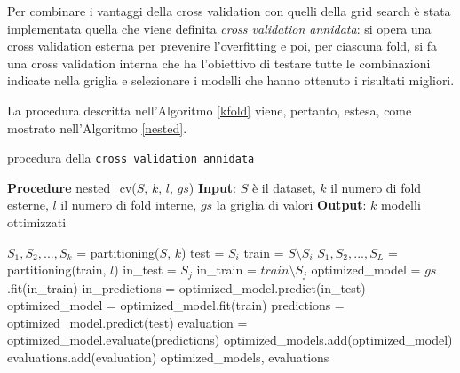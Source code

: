 \documentclass[12pt]{report}
\theoremstyle{definition}
\begin{document}
Per combinare i vantaggi della cross validation con quelli della grid search è stata implementata quella che viene definita \textit{cross validation annidata}: si opera una cross validation esterna per prevenire l'overfitting e poi, per ciascuna fold, si fa una cross validation interna che ha l'obiettivo di testare tutte le combinazioni indicate nella griglia e selezionare i modelli che hanno ottenuto i risultati migliori.

La procedura descritta nell'Algoritmo \ref{kfold} viene, pertanto, estesa, come mostrato nell'Algoritmo \ref{nested}.
\begin{algorithm}
\caption{procedura della \texttt{cross validation annidata}}
\label{nested}
\hspace*{\algorithmicindent} \textbf{Procedure} nested\_cv($S$, $k$, $l$, $gs$)
\newline
\hspace*{\algorithmicindent} \textbf{Input}: $S$ è il dataset, $k$ il numero di fold esterne, $l$ il numero di fold interne, $gs$ la griglia di valori
\newline
\hspace*{\algorithmicindent} \textbf{Output}: $k$ modelli ottimizzati
\begin{algorithmic}[1]
\STATE $S_1, S_2, ..., S_k$ = partitioning($S$, $k$)
\STATE test = $S_i$
\STATE train = $S \setminus S_i$
\STATE $S_1, S_2, ..., S_L$ = partitioning(train, $l$)
\STATE in\_test = $S_j$
\STATE in\_train = $train \setminus S_j$
\STATE optimized\_model = $gs$.fit(in\_train)
\STATE in\_predictions = optimized\_model.predict(in\_test)
\ENDFOR
\STATE optimized\_model = optimized\_model.fit(train)
\STATE predictions = optimized\_model.predict(test)
\STATE evaluation = optimized\_model.evaluate(predictions) 
\STATE optimized\_models.add(optimized\_model)
\STATE evaluations.add(evaluation)
\ENDFOR
\RETURN optimized\_models, evaluations
\end{algorithmic}
\end{algorithm}
\end{document}
